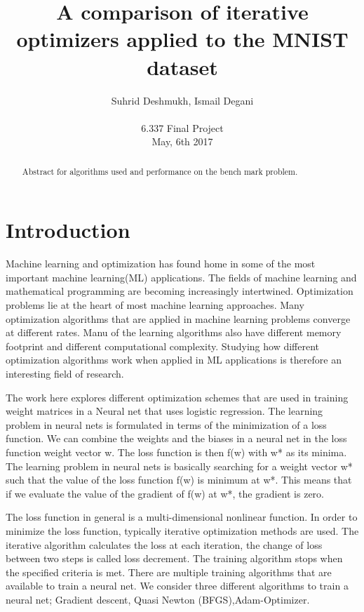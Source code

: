 \documentclass[10pt,twocolumn]{article}
\begin{document}
\title{A comparison of iterative optimizers applied to the MNIST dataset}

\author{Suhrid Deshmukh, Ismail Degani\\
\\
6.337 Final Project\\
May, 6th 2017\\
}

\maketitle
\thispagestyle{empty}

\begin{abstract}
   Abstract for algorithms used and performance on the bench mark problem.
\end{abstract}

\section{Introduction}

Machine learning and optimization has found home in some of the most important machine learning(ML) applications. The fields of machine learning and mathematical programming are becoming increasingly intertwined. Optimization problems lie at the heart of most machine learning approaches. Many optimization algorithms that  are applied in machine learning problems converge at different rates. Manu of the learning algorithms also have different memory footprint and different computational complexity. Studying how different optimization algorithms work when applied in ML applications is therefore an interesting field of research.

The work here explores different optimization schemes that are used in training weight matrices in a Neural net that uses logistic regression. The learning problem in neural nets is formulated in terms of the minimization of a loss function. We can combine the weights and the biases in a neural net in the loss function weight vector w. The loss function is then f(w) with w* as its minima. The learning problem in neural nets is basically searching for a weight vector w* such that the value of the loss function f(w) is minimum at w*. This means that if we evaluate the value of the gradient of f(w) at w*, the gradient is zero.

The loss function in general is a multi-dimensional nonlinear function. In order to minimize the loss function, typically iterative optimization methods are used. The iterative algorithm calculates the loss at each iteration, the change of loss between two steps is called loss decrement. The training algorithm stops when the specified criteria is met. There are multiple training algorithms that are available to train a neural net. We consider three  different algorithms to train a neural net; Gradient descent, Quasi Newton (BFGS),Adam-Optimizer.
\end{document}
